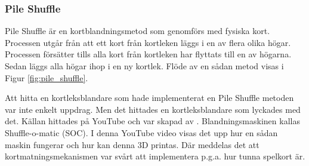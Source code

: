 \documentclass[swedish,a4paper]{article}
\begin{document}

\subsubsection{Pile Shuffle}
\label{sec:pile_shuffle}
Pile Shuffle är en kortblandningsmetod som genomförs med fysiska
kort. Processen utgår från att ett kort
från kortleken läggs i en av flera olika högar. Processen försätter
tills alla kort från kortleken har flyttats till en av högarna. Sedan
läggs  alla högar ihop i en ny kortlek. Flöde av en sådan metod visas i Figur
\ref{fig:pile_shuffle}.

Att hitta en kortleksblandare som hade implementerat en Pile Shuffle metoden var
inte enkelt uppdrag. Men det hittades en kortleksblandare som lyckades med det.
Källan hittades på YouTube  och var skapad av \textcite{3DprintedLife2021}.
Blandningsmaskinen kallas Shuffle-o-matic (SOC). I denna YouTube video visas
det upp hur en sådan maskin fungerar och hur kan denna 3D printas.  Där meddelas
det att kortmatningsmekanismen var svårt att implementera p.g.a. hur tunna
spelkort är.
\end{document}
